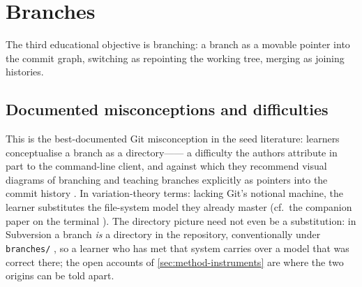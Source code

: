 \mode*
\section{Branches}
\label{sec:branches}

The third educational objective is branching: a branch as a movable pointer
into the commit graph, switching as repointing the working tree, merging as
joining histories.

\subsection{Documented misconceptions and difficulties}

This is the best-documented Git misconception in the seed literature:
learners conceptualise a branch as a directory------%
a difficulty the authors attribute in part to the command-line client, and
against which they recommend visual diagrams of branching and teaching
branches explicitly as pointers into the commit history
\autocite{IsomottonenCochez2014}.
In variation-theory terms: lacking Git's notional machine, the learner
substitutes the file-system model they already master (cf.\ the companion
paper on the terminal \autocite{VTTerminal}).
The directory picture need not even be a substitution: in Subversion a
branch \emph{is} a directory in the repository, conventionally under
\texttt{branches/} \autocite[Ch.~4]{SVNBook}, so a learner who has met
that system carries over a model that was correct there; the open
accounts of \cref{sec:method-instruments} are where the two origins can
be told apart.


